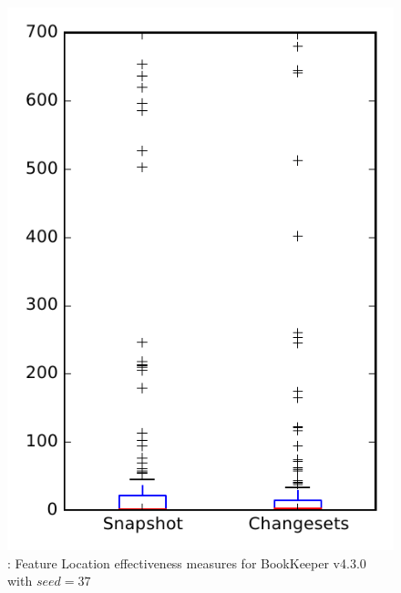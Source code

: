 
\begin{figure}
\centering
\includegraphics[height=0.4\textheight]{figures/flt_seed/rq1_bookkeeper_37}
\caption{\rone: Feature Location effectiveness measures for BookKeeper v4.3.0 with $seed=37$}
\label{fig:flt_seed:rq1:bookkeeper}
\end{figure}
